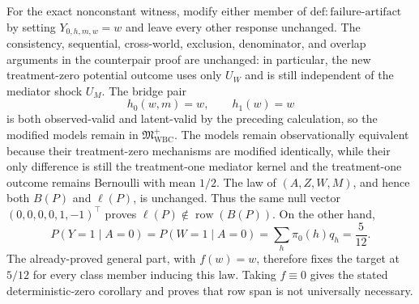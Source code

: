 For the exact nonconstant witness, modify either member of
\(\mathrm{def{:}failure\text{-}artifact}\) by setting
\(Y_{0,h,m,w}=w\) and leave every other response unchanged.  The consistency,
sequential, cross-world, exclusion, denominator, and overlap arguments in the
counterpair proof are unchanged: in particular, the new treatment-zero
potential outcome uses only \(U_W\) and is still independent of the mediator
shock \(U_M\).  The bridge pair
\[
 h_0(w,m)=w,\qquad h_1(w)=w
\]
is both observed-valid and latent-valid by the preceding calculation, so the
modified models remain in \(\mathfrak M_{\mathrm{WBC}}^{+}\).  The models
remain observationally equivalent because their treatment-zero mechanisms
are modified identically, while their only difference is still the
treatment-one mediator kernel and the treatment-one outcome remains
Bernoulli with mean \(1/2\).  The law of \((A,Z,W,M)\), and hence both
\(B(P)\) and \(\ell(P)\), is unchanged.  Thus the same null vector
\((0,0,0,0,1,-1)^{\top}\) proves
\(\ell(P)\notin\operatorname{row}(B(P))\).  On the other hand,
\[
 P(Y=1\mid A=0)=P(W=1\mid A=0)
 =\sum_h\pi _0(h)q_h=\frac5{12}.
\]
The already-proved general part, with \(f(w)=w\), therefore fixes the target
at \(5/12\) for every class member inducing this law.  Taking \(f\equiv0\)
gives the stated deterministic-zero corollary and proves that row span is not
universally necessary.